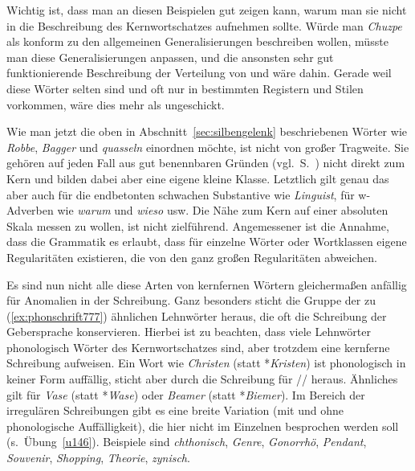 Wichtig ist, dass man an diesen Beispielen gut zeigen kann, warum man sie nicht in die Beschreibung des Kernwortschatzes aufnehmen sollte.
Würde man \textit{Chuzpe} \zB als konform zu den allgemeinen Generalisierungen beschreiben wollen, müsste man diese Generalisierungen anpassen, und die ansonsten sehr gut funktionierende Beschreibung der Verteilung von \textipa{[\c{c}]} und \textipa{[X]} wäre dahin.
Gerade weil diese Wörter selten sind und oft nur in bestimmten Registern und Stilen vorkommen, wäre dies mehr als ungeschickt.

Wie man jetzt die oben in Abschnitt~\ref{sec:silbengelenk} beschriebenen Wörter wie \textit{Robbe}, \textit{Bagger} und \textit{quasseln} einordnen möchte, ist nicht von großer Tragweite.
Sie gehören auf jeden Fall aus gut benennbaren Gründen (vgl.\ S.~\pageref{abs:robbe}) nicht direkt zum Kern und bilden dabei aber eine eigene kleine Klasse.
Letztlich gilt genau das aber auch für die endbetonten schwachen Substantive wie \textit{Linguist}, für w-Adverben wie \textit{warum} und \textit{wieso} usw.
Die Nähe zum Kern auf einer absoluten Skala messen zu wollen, ist nicht zielführend.
Angemessener ist die Annahme, dass die Grammatik es erlaubt, dass für einzelne Wörter oder Wortklassen eigene Regularitäten existieren, die von den ganz großen Regularitäten abweichen.

Es sind nun nicht alle diese Arten von kernfernen Wörtern gleichermaßen anfällig für Anomalien in der Schreibung.
Ganz besonders sticht die Gruppe der zu (\ref{ex:phonschrift777}) ähnlichen Lehnwörter heraus, die oft die Schreibung der Gebersprache konservieren.
Hierbei ist zu beachten, dass viele Lehnwörter phonologisch Wörter des Kernwortschatzes sind, aber trotzdem eine kernferne Schreibung aufweisen.
Ein Wort wie \textit{Christen} (statt *\textit{Kristen}) ist phonologisch in keiner Form auffällig, sticht aber durch die Schreibung \textipa{[chr]} für // heraus.
Ähnliches gilt für \textit{Vase} (statt *\textit{Wase}) oder \textit{Beamer} (statt *\textit{Biemer}).
Im Bereich der irregulären Schreibungen gibt es eine breite Variation (mit und ohne phonologische Auffälligkeit), die hier nicht im Einzelnen besprochen werden soll (s.\ Übung~\ref{u146}).
Beispiele sind \textit{chthonisch}, \textit{Genre}, \textit{Gonorrhö}, \textit{Pendant}, \textit{Souvenir}, \textit{Shopping}, \textit{Theorie}, \textit{zynisch}.

\Zusammenfassung

